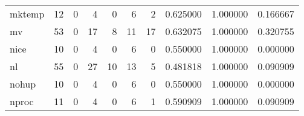 \begin{tabular}{lrrrrrrrrr}
mktemp    &                                       12 &                                                  0 &                                                  4 &                                                  0 &                                                  6 &                                                  2 &                                           0.625000 &                               1.000000 &                             0.166667 \\
mv        &                                       53 &                                                  0 &                                                 17 &                                                  8 &                                                 11 &                                                 17 &                                           0.632075 &                               1.000000 &                             0.320755 \\
nice      &                                       10 &                                                  0 &                                                  4 &                                                  0 &                                                  6 &                                                  0 &                                           0.550000 &                               1.000000 &                             0.000000 \\
nl        &                                       55 &                                                  0 &                                                 27 &                                                 10 &                                                 13 &                                                  5 &                                           0.481818 &                               1.000000 &                             0.090909 \\
nohup     &                                       10 &                                                  0 &                                                  4 &                                                  0 &                                                  6 &                                                  0 &                                           0.550000 &                               1.000000 &                             0.000000 \\
nproc     &                                       11 &                                                  0 &                                                  4 &                                                  0 &                                                  6 &                                                  1 &                                           0.590909 &                               1.000000 &                             0.090909 \\

\end{tabular}
